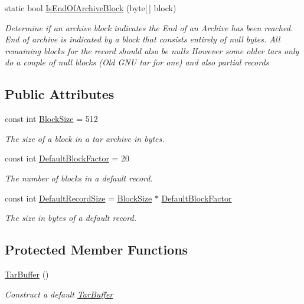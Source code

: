 \begin{DoxyCompactItemize}
static bool \hyperlink{class_i_c_sharp_code_1_1_sharp_zip_lib_1_1_tar_1_1_tar_buffer_a8cb2692cc566b69ded079be6881b09fe}{Is\+End\+Of\+Archive\+Block} (byte\mbox{[}$\,$\mbox{]} block)
\begin{DoxyCompactList}\small\item\em Determine if an archive block indicates the End of an Archive has been reached. End of archive is indicated by a block that consists entirely of null bytes. All remaining blocks for the record should also be null\textquotesingle{}s However some older tars only do a couple of null blocks (Old G\+NU tar for one) and also partial records \end{DoxyCompactList}\end{DoxyCompactItemize}
\subsection*{Public Attributes}
\begin{DoxyCompactItemize}
\item 
const int \hyperlink{class_i_c_sharp_code_1_1_sharp_zip_lib_1_1_tar_1_1_tar_buffer_a99cabe6ecd1046ab392bd6ed33bda07a}{Block\+Size} = 512
\begin{DoxyCompactList}\small\item\em The size of a block in a tar archive in bytes. \end{DoxyCompactList}\item 
const int \hyperlink{class_i_c_sharp_code_1_1_sharp_zip_lib_1_1_tar_1_1_tar_buffer_ae3effef164259c06765a1f3db66cb055}{Default\+Block\+Factor} = 20
\begin{DoxyCompactList}\small\item\em The number of blocks in a default record. \end{DoxyCompactList}\item 
const int \hyperlink{class_i_c_sharp_code_1_1_sharp_zip_lib_1_1_tar_1_1_tar_buffer_a0ab26cbd82b2726af0a0b76448c773d6}{Default\+Record\+Size} = \hyperlink{class_i_c_sharp_code_1_1_sharp_zip_lib_1_1_tar_1_1_tar_buffer_a99cabe6ecd1046ab392bd6ed33bda07a}{Block\+Size} $\ast$ \hyperlink{class_i_c_sharp_code_1_1_sharp_zip_lib_1_1_tar_1_1_tar_buffer_ae3effef164259c06765a1f3db66cb055}{Default\+Block\+Factor}
\begin{DoxyCompactList}\small\item\em The size in bytes of a default record. \end{DoxyCompactList}\end{DoxyCompactItemize}
\subsection*{Protected Member Functions}
\begin{DoxyCompactItemize}
\item 
\hyperlink{class_i_c_sharp_code_1_1_sharp_zip_lib_1_1_tar_1_1_tar_buffer_aee98b79315ca4d827da490a287bc93d2}{Tar\+Buffer} ()
\begin{DoxyCompactList}\small\item\em Construct a default \hyperlink{class_i_c_sharp_code_1_1_sharp_zip_lib_1_1_tar_1_1_tar_buffer}{Tar\+Buffer} \end{DoxyCompactList}\end{DoxyCompactItemize}
